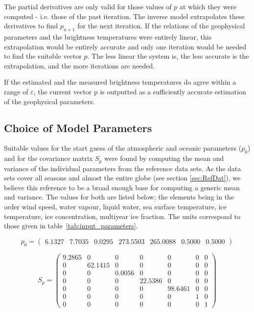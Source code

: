 \documentclass[11pt, a4paper]{article}
\begin{document}
The partial derivatives are only valid for those values of \(p\) at which they were computed - i.e. those of the past iteration. The inverse model extrapolates these derivatives to find \(p_{n+1}\) for the next iteration. If the relations of the geophysical parameters and the brightness temperatures were entirely linear, this extrapolation would be entirely accurate and only one iteration would be needed to find the suitable vector \(p\). The less linear the system is, the less accurate is the extrapolation, and the more iterations are needed.
\newline

If the estimated and the measured brightness temperatures do agree within a range of \(\varepsilon\), the current vector p is outputted as a sufficiently accurate estimation of the geophysical parameters.


\subsection{Choice of Model Parameters}

Suitable values for the start guess of the atmospheric and oceanic parameters (\(p_0\)) and for the covariance matrix \(S_p\) were found by computing the mean and variance of the individual parameters from the reference data sets. As the data sets cover all seasons and almost the entire globe (see section \ref{sec:RefDat}), we believe this reference to be a broad enough base for computing a generic mean and variance. The values for both are listed below; the elements being in the order wind speed, water vapour, liquid water, sea surface temperature, ice temperature, ice concentration, multiyear ice fraction. The units correspond to those given in \mbox{table \ref{tab:input_parameters}}.

\begin{equation*}
p_0 =
\begin{pmatrix}
   6.1327 & 7.7035 & 0.0295 & 273.5503 & 265.0088 & 0.5000 & 0.5000
\end{pmatrix}
\end{equation*}

\begin{equation*}
S_p =
\begin{pmatrix}
   9.2865 & 0 & 0 & 0 & 0 & 0 & 0 \\
   0 & 62.1415 & 0 & 0 & 0 & 0 & 0 \\
   0 & 0 & 0.0056 & 0 & 0 & 0 & 0 \\
   0 & 0 & 0 & 22.5386 & 0 & 0 & 0 \\
   0 & 0 & 0 & 0 & 98.6461 & 0 & 0 \\
   0 & 0 & 0 & 0 & 0 & 1 & 0 \\
   0 & 0 & 0 & 0 & 0 & 0 & 1
\end{pmatrix}
\end{equation*}
\end{document}
